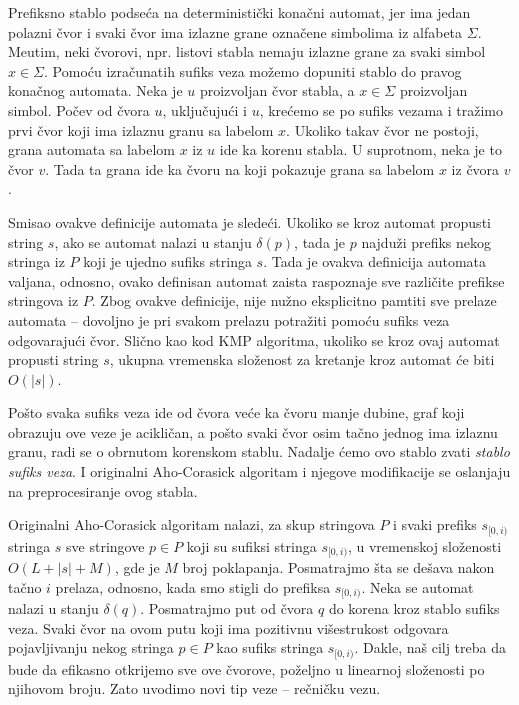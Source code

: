 Prefiksno stablo podse\' ca na deterministi\v cki kona\v cni automat, jer ima jedan polazni \v cvor i svaki \v cvor ima izlazne grane ozna\v cene simbolima iz alfabeta $\Sigma$. Me\dj utim, neki \v cvorovi, npr. listovi stabla nemaju izlazne grane za svaki simbol $x \in \Sigma$. Pomo\' cu izra\v cunatih sufiks veza mo\v zemo dopuniti stablo do pravog kona\v cnog automata. Neka je $u$ proizvoljan \v cvor stabla, a $x \in \Sigma$ proizvoljan simbol. Po\v cev od \v cvora $u$, uklju\v cuju\' ci i $u$, kre\' cemo se po sufiks vezama i tra\v zimo prvi \v cvor koji ima izlaznu granu sa labelom $x$. Ukoliko takav \v cvor ne postoji, grana automata sa labelom $x$ iz $u$ ide ka korenu stabla. U suprotnom, neka je to \v cvor $v$. Tada ta grana ide ka \v cvoru na koji pokazuje grana sa labelom $x$ iz \v cvora $v$.

Smisao ovakve definicije automata je slede\' ci. Ukoliko se kroz automat propusti string $s$, ako se automat nalazi u stanju $\delta(p)$, tada je $p$ najdu\v zi prefiks nekog stringa iz $P$ koji je ujedno sufiks stringa $s$. Tada je ovakva definicija automata valjana, odnosno, ovako definisan automat zaista raspoznaje sve razli\v cite prefikse stringova iz $P$. Zbog ovakve definicije, nije nu\v zno eksplicitno pamtiti sve prelaze automata -- dovoljno je pri svakom prelazu potra\v ziti pomo\' cu sufiks veza odgovaraju\' ci \v cvor. Sli\v cno kao kod KMP algoritma, ukoliko se kroz ovaj automat propusti string $s$, ukupna vremenska slo\v zenost za kretanje kroz automat \' ce biti $O(|s|)$. \cite{ahorad}

Po\v sto svaka sufiks veza ide od \v cvora ve\' ce ka \v cvoru manje dubine, graf koji obrazuju ove veze je acikli\v can, a po\v sto svaki \v cvor osim ta\v cno jednog ima izlaznu granu, radi se o obrnutom korenskom stablu. Nadalje \' cemo ovo stablo zvati \textit{stablo sufiks veza}. I originalni Aho-Corasick algoritam i njegove modifikacije se oslanjaju na preprocesiranje ovog stabla.

Originalni Aho-Corasick algoritam nalazi, za skup stringova $P$ i svaki prefiks $s_{[0,i)}$ stringa $s$ sve stringove $p \in P$ koji su sufiksi stringa $s_{[0,i)}$, u vremenskoj slo\v zenosti $O(L+|s|+M)$, gde je $M$ broj poklapanja. Posmatrajmo \v sta se de\v sava nakon ta\v cno $i$ prelaza, odnosno, kada smo stigli do prefiksa $s_{[0,i)}$. Neka se automat nalazi u stanju $\delta(q)$. Posmatrajmo put od \v cvora $q$ do korena kroz stablo sufiks veza. Svaki \v cvor na ovom putu koji ima pozitivnu vi\v sestrukost odgovara pojavljivanju nekog stringa $p \in P$ kao sufiks stringa $s_{[0,i)}$. Dakle, na\v s cilj treba da bude da efikasno otkrijemo sve ove \v cvorove, po\v zeljno u linearnoj slo\v zenosti po njihovom broju. Zato uvodimo novi tip veze -- re\v cni\v cku vezu.

